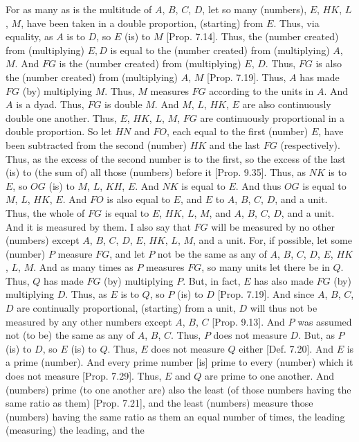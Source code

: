 \begin{Parallel}{}{}
{For as many as is the multitude of $A$, $B$, $C$, $D$, let so many (numbers), $E$, $HK$, $L$, $M$, have been taken in a double
proportion, (starting) from $E$. Thus, via equality, as $A$ is to $D$, so
$E$ (is) to $M$ [Prop. 7.14].
Thus, the (number created) from (multiplying) $E, D$ is equal to the (number
created) from (multiplying) $A$, $M$.
 And $FG$ is the
(number created) from (multiplying) $E$, $D$. Thus, $FG$ is also
the (number created) from (multiplying) $A$, $M$ [Prop. 7.19]. Thus, $A$ has made $FG$ (by) multiplying $M$. Thus, $M$ measures $FG$ according to the units in $A$.
And $A$ is a dyad. Thus, $FG$ is double $M$.  And $M$, $L$, $HK$,
$E$ are also continuously double one another. Thus, $E$, $HK$, $L$, $M$,
$FG$ are continuously proportional in a double proportion. So
let $HN$ and $FO$, each equal to the first (number) $E$, have been subtracted from the second (number) $HK$ and the last $FG$ (respectively). 
Thus, as the excess of the second number is to the first, so the excess
of the last (is) to (the sum of) all  those (numbers) before it [Prop. 9.35]. Thus, as $NK$ is to $E$, so
$OG$ (is) to $M$, $L$, $KH$, $E$. And $NK$ is equal to $E$. And thus
$OG$ is equal to $M$, $L$, $HK$, $E$. And $FO$ is also equal to $E$,
and $E$ to $A$, $B$, $C$, $D$, and a unit. Thus, the whole of $FG$ is equal to
$E$, $HK$, $L$, $M$, and $A$, $B$, $C$, $D$, and a unit. And it is
measured by them. I also say that $FG$ will be measured by no other (numbers)
except $A$, $B$, $C$, $D$, $E$, $HK$, $L$, $M$, and a unit. For, if possible, let some (number) $P$ measure $FG$, and let $P$ not be the same
as any of $A$, $B$, $C$, $D$, $E$, $HK$, $L$, $M$. And as many times
as $P$ measures $FG$, so many units let there be in $Q$. Thus, $Q$ has
made $FG$ (by) multiplying $P$. But, in fact, $E$ has  also made $FG$
(by) multiplying $D$. Thus, as $E$ is to $Q$, so $P$ (is) to $D$
[Prop. 7.19]. And since $A$, $B$, $C$, $D$
are continually proportional, (starting) from a unit, $D$ will thus not be measured
by any other numbers except $A$, $B$, $C$ [Prop. 9.13]. And $P$ was assumed not (to be) the same as any of $A$, $B$, $C$. Thus, $P$ does not measure $D$. But, as $P$ (is) to
$D$, so $E$ (is) to $Q$. Thus, $E$ does not measure $Q$ either
 [Def. 7.20]. And $E$ is a prime (number).
And every prime number [is] prime to every  (number) which it does not
measure [Prop. 7.29]. Thus, $E$ and $Q$ are
prime to one another. And  (numbers) prime (to one another are) also the least (of those
numbers having the same ratio as them) [Prop. 7.21],
and the least (numbers) measure those (numbers) having the same ratio as them an equal number of times, the leading (measuring) the leading, and the
}
\end{Parallel}
